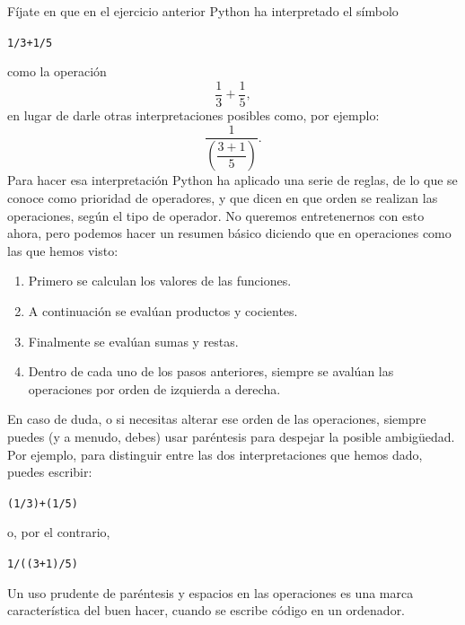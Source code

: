 \documentclass[10pt,a4paper]{article}\usepackage[]{graphicx}\usepackage[]{color}
\makeatletter
\newcommand{\hlnum}[1]{\textcolor[rgb]{0.686,0.059,0.569}{#1}}%
\newcommand{\hlopt}[1]{\textcolor[rgb]{0,0,0}{#1}}%
\newcommand{\hlstd}[1]{\textcolor[rgb]{0.345,0.345,0.345}{#1}}%
\newenvironment{kframe}{%
 \def\at@end@of@kframe{}%
 \ifinner\ifhmode%
  \def\at@end@of@kframe{\end{minipage}}%
  \begin{minipage}{\columnwidth}%
 \fi\fi%
 \def\FrameCommand##1{\hskip\@totalleftmargin \hskip-\fboxsep
 \colorbox{shadecolor}{##1}\hskip-\fboxsep
     \hskip-\linewidth \hskip-\@totalleftmargin \hskip\columnwidth}%
 \MakeFramed {\advance\hsize-\width
   \@totalleftmargin\z@ \linewidth\hsize
   \@setminipage}}%
 {\par\unskip\endMakeFramed%
 \at@end@of@kframe}
\newenvironment{knitrout}{}{} %
\newcounter {cont01}
\makeatother
\begin{document}
Fíjate en que en el ejercicio anterior Python ha interpretado el símbolo
\begin{knitrout}
\color{fgcolor}\begin{kframe}
\begin{alltt}
\hlnum{1}\hlopt{/}\hlnum{3}\hlopt{+}\hlnum{1}\hlopt{/}\hlnum{5}
\end{alltt}
\end{kframe}
\end{knitrout}
como la operación
\[\dfrac{1}{3}+\dfrac{1}{5},\]
en lugar de darle otras interpretaciones posibles como, por ejemplo:
\[\dfrac{1}{\left(\dfrac{3+1}{5}\right)}.\]
Para hacer esa interpretación Python ha aplicado una serie de reglas, de lo que se conoce como {\sf prioridad de operadores}, y que dicen en que orden se realizan las operaciones, según el tipo de operador. No queremos entretenernos con esto ahora, pero podemos hacer un resumen básico diciendo que en operaciones como las que hemos visto:
\begin{enumerate}
\item Primero se calculan los valores de las funciones.
\item A continuación se evalúan productos y cocientes.
\item Finalmente se evalúan sumas y restas.
\item Dentro de cada uno de los pasos anteriores, siempre se avalúan las operaciones  por orden de izquierda a derecha.
\end{enumerate}
En caso de duda, o si necesitas alterar ese orden de las operaciones, siempre puedes (y a menudo, debes) usar paréntesis para despejar la posible ambigüedad. Por ejemplo, para distinguir entre las dos interpretaciones que hemos dado, puedes escribir:
\begin{knitrout}
\color{fgcolor}\begin{kframe}
\begin{alltt}
\hlstd{(}\hlnum{1}\hlopt{/}\hlnum{3}\hlstd{)}\hlopt{+}\hlstd{(}\hlnum{1}\hlopt{/}\hlnum{5}\hlstd{)}
\end{alltt}
\end{kframe}
\end{knitrout}
o, por el contrario,
\begin{knitrout}
\color{fgcolor}\begin{kframe}
\begin{alltt}
\hlnum{1} \hlopt{/}\hlstd{( (}\hlnum{3}\hlopt{+}\hlnum{1}\hlstd{)}\hlopt{/}\hlnum{5} \hlstd{)}
\end{alltt}
\end{kframe}
\end{knitrout}
Un uso prudente de paréntesis y espacios en las operaciones es una marca característica del buen hacer, cuando se escribe código en un ordenador.
\end{document}
